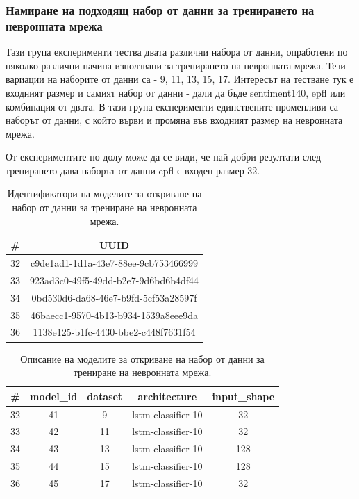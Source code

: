 \documentclass{article}
\begin{document}
\subsubsection{Намиране на подходящ набор от данни за тренирането на невронната мрежа}

Тази група експерименти тества двата различни набора от данни, опработени по няколко различни начина използвани за
тренирането на невронната мрежа. Тези вариации на наборите от данни са - 9, 11, 13, 15, 17. Интересът на тестване тук е
входният размер и самият набор от данни - дали да бъде sentiment140, epfl или комбинация от двата. В тази група
експерименти единствените променливи са наборът от данни, с който върви и промяна във входният размер на невронната
мрежа.

От експериментите по-долу може да се види, че най-добри резултати след тренирането дава наборът от данни epfl с входен
размер 32.

\begin{table}[H]
\centering
\captionsetup{justification=centering}
\begin{tabular}{|c||c|}
\hline
\# & UUID\\
\hline
32 & c9de1ad1-1d1a-43e7-88ee-9cb753466999\\
33 & 923ad3c0-49f5-49dd-b2e7-9d6bd6b4df44\\
34 & 0bd530d6-da68-46e7-b9fd-5cf53a28597f\\
35 & 46baecc1-9570-4b13-b934-1539a8eee9da\\
36 & 1138e125-b1fc-4430-bbe2-c448f7631f54\\
\hline
\end{tabular}
\caption{Идентификатори на моделите за откриване на набор от данни за трениране на невронната мрежа.}
\end{table}

\begin{table}[H]
\centering
\captionsetup{justification=centering}
\begin{tabular}{|c||c|c|c|c|}
\hline
\# & model\_id & dataset & architecture & input\_shape\\
\hline
32 & 41 & 9 & lstm-classifier-10 & 32\\
33 & 42 & 11 & lstm-classifier-10 & 32\\
34 & 43 & 13 & lstm-classifier-10 & 128\\
35 & 44 & 15 & lstm-classifier-10 & 128\\
36 & 45 & 17 & lstm-classifier-10 & 32\\
\hline
\end{tabular}
\caption{Описание на моделите за откриване на набор от данни за трениране на невронната мрежа.}
\end{table}
\end{document}
